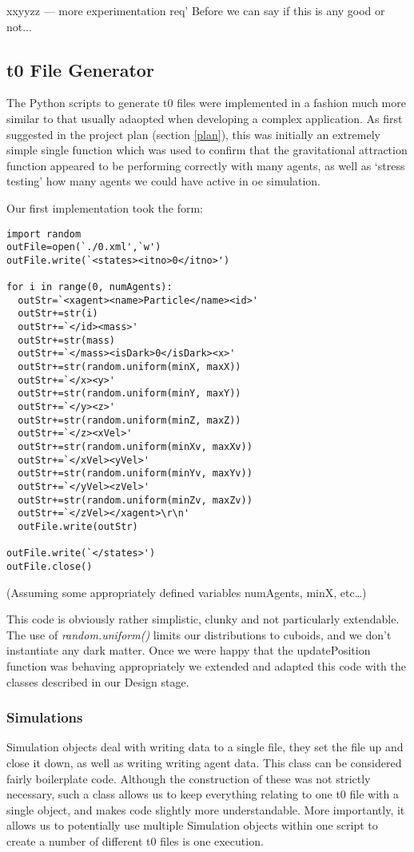 \documentclass[11pt,a4paper]{article}
\begin{document}
xxyyzz --- more experimentation req' Before we can say if this is any good or not...

\subsection{t0 File Generator}

The Python scripts to generate t0 files were implemented in a fashion much more similar to that usually adaopted when developing a complex application. As first suggested in the project plan (section \ref{plan}), this was initially an extremely simple single function which was used to confirm that the gravitational attraction function appeared to be performing correctly with many agents, as well as `stress testing' how many agents we could have active in oe simulation.

Our first implementation took the form:
\begin{lstlisting}
import random
outFile=open(`./0.xml',`w')
outFile.write(`<states><itno>0</itno>')

for i in range(0, numAgents):
  outStr=`<xagent><name>Particle</name><id>'
  outStr+=str(i)
  outStr+=`</id><mass>'
  outStr+=str(mass)
  outStr+=`</mass><isDark>0</isDark><x>'
  outStr+=str(random.uniform(minX, maxX))
  outStr+=`</x><y>'
  outStr+=str(random.uniform(minY, maxY))
  outStr+=`</y><z>'
  outStr+=str(random.uniform(minZ, maxZ))
  outStr+=`</z><xVel>'
  outStr+=str(random.uniform(minXv, maxXv))
  outStr+=`</xVel><yVel>'
  outStr+=str(random.uniform(minYv, maxYv))
  outStr+=`</yVel><zVel>'
  outStr+=str(random.uniform(minZv, maxZv))
  outStr+=`</zVel></xagent>\r\n'
  outFile.write(outStr)

outFile.write(`</states>')
outFile.close()
\end{lstlisting}
(Assuming some appropriately defined variables numAgents, minX, etc\ldots)

This code is obviously rather simplistic, clunky and not particularly extendable. The use of \emph{random.uniform()} limits our distributions to cuboids, and we don't instantiate any dark matter. Once we were happy that the updatePosition function was behaving appropriately we extended and adapted this code with the classes described in our Design stage. 

\subsubsection{Simulations}
Simulation objects deal with writing data to a single file, they set the file up and close it down, as well as writing writing agent data. This class can be considered fairly boilerplate code. Although the construction of these was not strictly necessary, such a class allows us to keep everything relating to one t0 file with a single object, and makes code slightly more understandable. More importantly, it allows us to potentially use multiple Simulation objects within one script to create a number of different t0 files is one execution.
\end{document}
